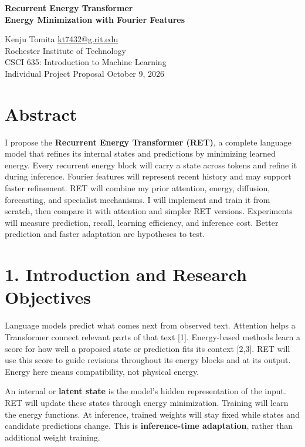 \documentclass[11pt,letterpaper]{article}
\begin{document}
\begin{center}
{\Large\bfseries Recurrent Energy Transformer\\Energy Minimization with Fourier Features}\par
\vspace{3pt}
Kenju Tomita \quad \href{mailto:kt7432@g.rit.edu}{kt7432@g.rit.edu}\\
Rochester Institute of Technology\\
CSCI 635: Introduction to Machine Learning\\
Individual Project Proposal \quad October 9, 2026
\end{center}

\section*{Abstract}

I propose the \textbf{Recurrent Energy Transformer (RET)}, a complete language model that refines its internal states and predictions by minimizing learned energy. Every recurrent energy block will carry a state across tokens and refine it during inference. Fourier features will represent recent history and may support faster refinement. RET will combine my prior attention, energy, diffusion, forecasting, and specialist mechanisms. I will implement and train it from scratch, then compare it with attention and simpler RET versions. Experiments will measure prediction, recall, learning efficiency, and inference cost. Better prediction and faster adaptation are hypotheses to test.

\section*{1. Introduction and Research Objectives}

Language models predict what comes next from observed text. Attention helps a Transformer connect relevant parts of that text [1]. Energy-based methods learn a score for how well a proposed state or prediction fits its context [2,3]. RET will use this score to guide revisions throughout its energy blocks and at its output. Energy here means compatibility, not physical energy.

An internal or \textbf{latent state} is the model's hidden representation of the input. RET will update these states through energy minimization. Training will learn the energy functions. At inference, trained weights will stay fixed while states and candidate predictions change. This is \textbf{inference-time adaptation}, rather than additional weight training.
\end{document}
